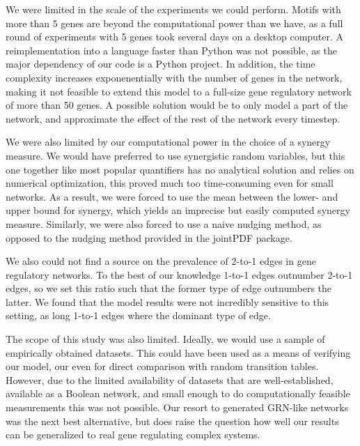 \documentclass[../main.tex]{subfiles}
\begin{document}
We were limited in the scale of the experiments we could perform.
Motifs with more than 5 genes are beyond the computational power than we have, as a full round of experiments with 5 genes took several days on a desktop computer. %
A reimplementation into a language faster than Python was not possible, as the major dependency of our code is a Python project.
In addition, the time complexity increases exponenentially with the number of genes in the network, making it not feasible to extend this model to a full-size gene regulatory network of more than 50 genes.
A possible solution would be to only model a part of the network, and approximate the effect of the rest of the network every timestep.

We were also limited by our computational power in the choice of a synergy measure.
We would have preferred to use synergistic random variables, but this one together like most popular quantifiers has no analytical solution and relies on numerical optimization, this proved much too time-consuming even for small networks.
As a result, we were forced to use the mean between the lower- and upper bound for synergy, which yields an imprecise but easily computed synergy measure.
Similarly, we were also forced to use a naive nudging method, as opposed to the nudging method provided in the jointPDF package.

We also could not find a source on the prevalence of 2-to-1 edges in gene regulatory networks.
To the best of our knowledge 1-to-1 edges outnumber 2-to-1 edges, so we set this ratio such that the former type of edge outnumbers the latter.
We found that the model results were not incredibly sensitive to this setting, as long 1-to-1 edges where the dominant type of edge.

The scope of this study was also limited.
Ideally, we would use a sample of empirically obtained datasets.
This could have been used as a means of verifying our model, our even for direct comparison with random transition tables. %
However, due to the limited availability of datasets that are well-established, available as a Boolean network, and small enough to do computationally feasible measurements this was not possible.
Our resort to generated GRN-like networks was the next best alternative, but does raise the question how well our results can be generalized to real gene regulating complex systems.
\end{document}

